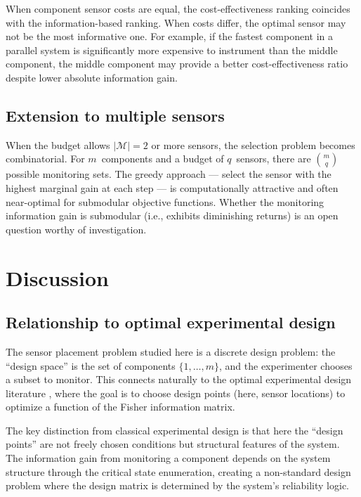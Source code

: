 \documentclass[12pt]{article}
\theoremstyle{definition}
\theoremstyle{remark}
\begin{document}
When component sensor costs are equal, the cost-effectiveness ranking
coincides with the information-based ranking.  When costs differ, the
optimal sensor may not be the most informative one.  For example, if
the fastest component in a parallel system is significantly more
expensive to instrument than the middle component, the middle component
may provide a better cost-effectiveness ratio despite lower absolute
information gain.

\subsection{Extension to multiple sensors}
\label{sec:multiple-sensors}

When the budget allows $|\mathcal{M}| = 2$ or more sensors, the
selection problem becomes combinatorial.  For $m$~components and a
budget of $q$~sensors, there are $\binom{m}{q}$ possible monitoring
sets.  The greedy approach --- select the sensor with the highest
marginal gain at each step --- is computationally attractive and often
near-optimal for submodular objective functions.  Whether the
monitoring information gain is submodular (i.e., exhibits diminishing
returns) is an open question worthy of investigation.


\section{Discussion}
\label{sec:discussion}

\subsection{Relationship to optimal experimental design}
\label{sec:design-connection}

The sensor placement problem studied here is a discrete design
problem: the ``design space'' is the set of components
$\{1, \ldots, m\}$, and the experimenter chooses a subset to monitor.
This connects naturally to the optimal experimental design literature
\citep{Atkinson2007, Pukelsheim2006}, where the goal is to choose
design points (here, sensor locations) to optimize a function of the
Fisher information matrix.

The key distinction from classical experimental design is that here the
``design points'' are not freely chosen conditions but structural
features of the system.  The information gain from monitoring a
component depends on the system structure through the critical state
enumeration, creating a non-standard design problem where the design
matrix is determined by the system's reliability logic.
\end{document}
